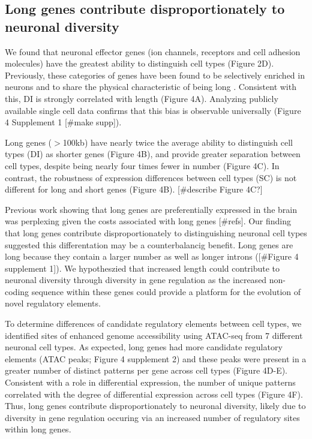 \subsection{Long genes contribute disproportionately to neuronal diversity}

We found that neuronal effector genes (ion channels, receptors and cell adhesion molecules) have the greatest ability to distinguish cell types (Figure 2D). Previously, these categories of genes have been found to be selectively enriched in neurons and to share the physical characteristic of being long \citep{Sugino_2014,Gabel_2015,Zylka_2015}. Consistent with this, DI is strongly correlated with length (Figure 4A). Analyzing publicly available single cell data confirms that this bias is observable universally (Figure 4 Supplement 1 [#make supp]). 

Long genes ($\gt$100kb) have nearly twice the average ability to distinguish cell types (DI) as shorter genes (Figure 4B), and provide greater separation between cell types, despite being nearly four times fewer in number (Figure 4C). In contrast, the robustness of expression differences between cell types (SC) is not different for long and short genes (Figure 4B). [#describe Figure 4C?] 

Previous work showing that long genes are preferentially expressed in the brain was perplexing given the costs associated with long genes [#refs]. Our finding that long genes contribute disproportionately to distinguishing neuronal cell types suggested this differentation may be a counterbalancig benefit. Long genes are long because they contain a larger number as well as longer introns ([#Figure 4 supplement 1]). We hypotheszied that increased length could contribute to neuronal diversity through diversity in gene regulation as the increased non-coding sequence within these genes could provide a platform for the evolution of novel regulatory elements.

To determine differences of candidate regulatory elements between cell types, we identified sites of enhanced genome accessibility using ATAC-seq \cite{Buenrostro_2013} from 7 different neuronal cell types. As expected, long genes had more candidate regulatory elements (ATAC peaks; Figure 4 supplement 2) and these peaks were present in a greater number of distinct patterns per gene across cell types (Figure 4D-E). Consistent with a role in differential expression, the number of unique patterns correlated with the degree of differential expression across cell types (Figure 4F). Thus, long genes contribute disproportionately to neuronal diversity, likely due to diversity in gene regulation occuring via an increased number of regulatory sites within long genes. 


